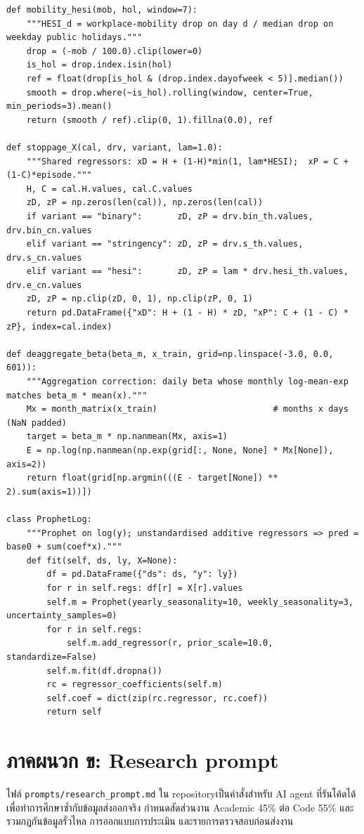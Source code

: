 \documentclass{article}
\theoremstyle{definition}
\begin{document}
\begin{lstlisting}
def mobility_hesi(mob, hol, window=7):
    """HESI_d = workplace-mobility drop on day d / median drop on weekday public holidays."""
    drop = (-mob / 100.0).clip(lower=0)
    is_hol = drop.index.isin(hol)
    ref = float(drop[is_hol & (drop.index.dayofweek < 5)].median())
    smooth = drop.where(~is_hol).rolling(window, center=True, min_periods=3).mean()
    return (smooth / ref).clip(0, 1).fillna(0.0), ref

def stoppage_X(cal, drv, variant, lam=1.0):
    """Shared regressors: xD = H + (1-H)*min(1, lam*HESI);  xP = C + (1-C)*episode."""
    H, C = cal.H.values, cal.C.values
    zD, zP = np.zeros(len(cal)), np.zeros(len(cal))
    if variant == "binary":       zD, zP = drv.bin_th.values, drv.bin_cn.values
    elif variant == "stringency": zD, zP = drv.s_th.values, drv.s_cn.values
    elif variant == "hesi":       zD, zP = lam * drv.hesi_th.values, drv.e_cn.values
    zD, zP = np.clip(zD, 0, 1), np.clip(zP, 0, 1)
    return pd.DataFrame({"xD": H + (1 - H) * zD, "xP": C + (1 - C) * zP}, index=cal.index)

def deaggregate_beta(beta_m, x_train, grid=np.linspace(-3.0, 0.0, 601)):
    """Aggregation correction: daily beta whose monthly log-mean-exp matches beta_m * mean(x)."""
    Mx = month_matrix(x_train)                       # months x days (NaN padded)
    target = beta_m * np.nanmean(Mx, axis=1)
    E = np.log(np.nanmean(np.exp(grid[:, None, None] * Mx[None]), axis=2))
    return float(grid[np.argmin(((E - target[None]) ** 2).sum(axis=1))])

class ProphetLog:
    """Prophet on log(y); unstandardised additive regressors => pred = base0 + sum(coef*x)."""
    def fit(self, ds, ly, X=None):
        df = pd.DataFrame({"ds": ds, "y": ly})
        for r in self.regs: df[r] = X[r].values
        self.m = Prophet(yearly_seasonality=10, weekly_seasonality=3, uncertainty_samples=0)
        for r in self.regs:
            self.m.add_regressor(r, prior_scale=10.0, standardize=False)
        self.m.fit(df.dropna())
        rc = regressor_coefficients(self.m)
        self.coef = dict(zip(rc.regressor, rc.coef))
        return self
\end{lstlisting}

\section*{ภาคผนวก ข: Research prompt}
ไฟล์ \texttt{prompts/research\_prompt.md} ใน repositoryเป็นคำสั่งสำหรับ AI agent ที่รันโค้ดได้ เพื่อทำการศึกษาซ้ำกับข้อมูลส่งออกจริง กำหนดสัดส่วนงาน Academic 45\% ต่อ Code 55\% และรวมกฎกันข้อมูลรั่วไหล การออกแบบการประเมิน และรายการตรวจสอบก่อนส่งงาน
\end{document}
